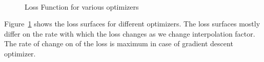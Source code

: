 \documentclass[12pt]{report}
\begin{document}
\begin{figure}[H]
	\\
	\caption{Loss Function for various optimizers}
	\label{fig:2}
\end{figure}

Figure~\ref{fig:2} shows the loss surfaces for different optimizers. The loss surfaces mostly differ on the rate with which the loss changes as we change interpolation factor. The rate of change on of the loss is maximum in case of gradient descent optimizer.
\end{document}
